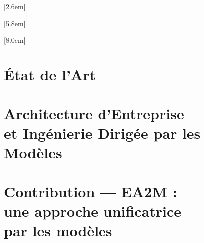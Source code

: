 \documentclass[a4paper,11pt,twoside]{book}
\begin{document}

    [2.6em]                  %
    {\bfseries}              %
    {\contentslabel{2.3em}}  %
    {\hspace*{-2.3em}}
    {\hfill\contentspage}

    [5.8em]
    {}
    {\contentslabel{3.2em}}
    {}
    {\hfill\contentspage}

    [8.0em]
    {}
    {\contentslabel{3.2em}}
    {}
    {\hfill\contentspage}

    \newcommand{\PartialToc}{%
        \vspace*{1pc}\vbox{\textbf{Sommaire}}\vspace*{0.5pc}
        \hrule\vspace*{0.5pc}
        \startcontents[chapters]
        \printcontents[chapters]{p}{1}{}\vspace*{0.5pc}\hrule}
    \cleardoublepage
    \tableofcontents
    \mainmatter

    \setcounter{tocdepth}{3}
    
    \part{État de l'Art\\—\\Architecture d'Entreprise\\et Ingénierie Dirigée par les Modèles}
    
    
    \part{Contribution — EA2M : \\ une approche unificatrice \\par les modèles}
	
	
	
    
    \appendix
    
    \printglossaries
    
    
\end{document}
